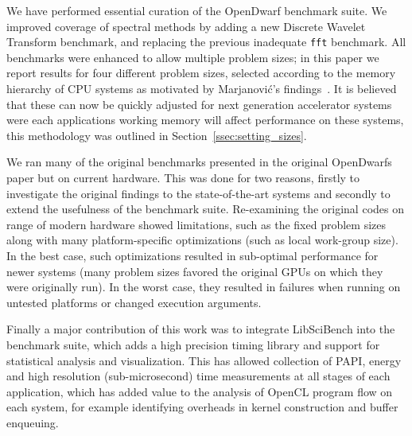 \documentclass[../document.tex]{subfiles}
\begin{document}
\label{sec:conclusions}

We have performed essential curation of the OpenDwarf benchmark suite.
We improved coverage of spectral methods by adding a new Discrete Wavelet Transform benchmark, and replacing the previous inadequate {\tt fft} benchmark.
All benchmarks were enhanced to allow multiple problem sizes; in this paper we report results for four different problem sizes, selected according to the memory hierarchy of CPU systems as motivated by Marjanovi{\'c}'s findings~\cite{marjanovic2016hpc}.
It is believed that these can now be quickly adjusted for next generation accelerator systems were each applications working memory will affect performance on these systems, this methodology was outlined in Section~\ref{ssec:setting_sizes}.

We ran many of the original benchmarks presented in the original OpenDwarfs~\cite{krommydas2016opendwarfs} paper but on current hardware.
This was done for two reasons, firstly to investigate the original findings to the state-of-the-art systems and secondly to extend the usefulness of the benchmark suite.
Re-examining the original codes on range of modern hardware showed limitations, such as the fixed problem sizes along with many platform-specific optimizations (such as local work-group size).
In the best case, such optimizations resulted in sub-optimal performance for newer systems (many problem sizes favored the original GPUs on which they were originally run).
In the worst case, they resulted in failures when running on untested platforms or changed execution arguments.

Finally a major contribution of this work was to integrate LibSciBench into the benchmark suite, which adds a high precision timing library and support for statistical analysis and visualization.
This has allowed collection of PAPI, energy and high resolution (sub-microsecond) time measurements at all stages of each application, which has added value to the analysis of OpenCL program flow on each system, for example identifying overheads in kernel construction and buffer enqueuing.
\end{document}

